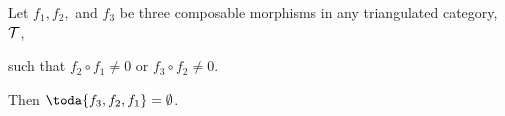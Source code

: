 \begin{proposition}
	Let \( f_1, f_2, \) and \( f_3 \) be three composable morphisms in any triangulated category, \( {\mathcal{T}} \),
	\begin{center}
	\end{center}
	such that \( f_2 \circ f_1 \neq 0 \) or \( f_3 \circ f_2 \neq 0 \).

	Then \( \toda{f_3, f_2, f_1} = \emptyset \).
\end{proposition}
